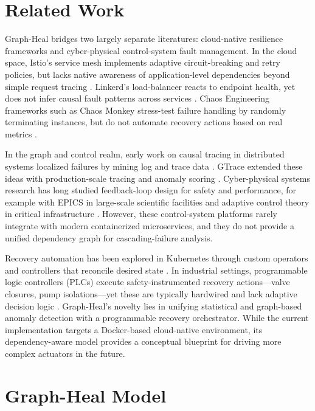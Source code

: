\documentclass[11pt,conference]{IEEEtran}
\begin{document}
\section{Related Work}

Graph-Heal bridges two largely separate literatures: cloud-native resilience frameworks and cyber-physical control-system fault management.  In the cloud space, Istio's service mesh implements adaptive circuit-breaking and retry policies, but lacks native awareness of application-level dependencies beyond simple request tracing \cite{Morgan2017}.  Linkerd's load-balancer reacts to endpoint health, yet does not infer causal fault patterns across services \cite{Sigelman2016}.  Chaos Engineering frameworks such as Chaos Monkey stress-test failure handling by randomly terminating instances, but do not automate recovery actions based on real metrics \cite{Basiri2017}.

In the graph and control realm, early work on causal tracing in distributed systems localized failures by mining log and trace data \cite{Chen2004}.  GTrace extended these ideas with production-scale tracing and anomaly scoring \cite{Zhu2018}.  Cyber-physical systems research has long studied feedback-loop design for safety and performance, for example with EPICS in large-scale scientific facilities \cite{Dalesio1993} and adaptive control theory in critical infrastructure \cite{Lee2008}.  However, these control-system platforms rarely integrate with modern containerized microservices, and they do not provide a unified dependency graph for cascading-failure analysis.

Recovery automation has been explored in Kubernetes through custom operators and controllers that reconcile desired state \cite{Hightower2017}.  In industrial settings, programmable logic controllers (PLCs) execute safety-instrumented recovery actions—valve closures, pump isolations—yet these are typically hardwired and lack adaptive decision logic \cite{DOE2010}.  Graph-Heal's novelty lies in unifying statistical and graph-based anomaly detection with a programmable recovery orchestrator. While the current implementation targets a Docker-based cloud-native environment, its dependency-aware model provides a conceptual blueprint for driving more complex actuators in the future.


\section{Graph-Heal Model}
\label{sec:graphheal-model}
\end{document}
